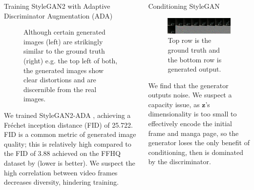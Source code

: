 \documentclass{beamer}                             %
\begin{document}
\begin{frame}
\begin{columns}
\begin{column}{0.33\textwidth}
\begin{block}{Training StyleGAN2 with Adaptive Discriminator Augmentation (ADA) \cite{stylegan2ada}}
\begin{figure}[h!]
\begin{subfigure}[h]{0.49 \textwidth}
            \end{subfigure}
            \caption{Although certain generated images (left) are strikingly
              similar to the ground truth (right) e.g. the top left of both,
              the generated images show clear distortions and are discernible
              from the real images.}
            \label{fig:samples}
        \end{figure}

        We trained StyleGAN2-ADA \cite{stylegan2ada}, achieving a Fréchet
        inception distance (FID) of 25.722. FID is a common metric of
        generated image quality; this is relatively high compared to the
        FID of 3.88 achieved on the FFHQ dataset by \cite{stylegan2ada}
        (lower is better). We suspect the high correlation between video
        frames decreases diversity, hindering training.
      \end{block}

    \end{column}


    \begin{column}{0.33\textwidth}

      \begin{block}{Conditioning StyleGAN}
      \setlength{\parindent}{1em}
        \begin{figure}[h!]
          \centering
          \includegraphics[scale=0.4]{results_gen}
          \caption{Top row is the ground truth and
                   the bottom row is generated output.}
          \label{fig:gen}
        \end{figure}

        We find that the generator outputs noise. We suspect a capacity issue,
        as \( \bm{z} \)'s dimensionality is too small to effectively encode the
        initial frame and manga page, so the generator loses the only benefit
        of conditioning, then is dominated by the discriminator.
       \end{block}


\end{column}
\end{columns}
\end{frame}
\end{document}
